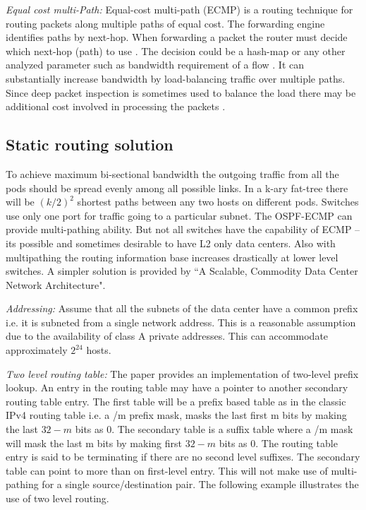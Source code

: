 \documentclass[11pt,letterpaper,onecolumn]{article}
\begin{document}
\par{\textit{Equal cost multi-Path:} Equal-cost multi-path (ECMP) is a routing technique for routing packets along multiple paths of equal cost.  The forwarding engine identifies paths by next-hop.  When forwarding a packet the router must decide which next-hop (path) to use \cite{hopps2000analysis}. The decision could be a hash-map or any other analyzed parameter such as bandwidth requirement of a flow . It can substantially increase bandwidth by load-balancing traffic over multiple paths. Since deep packet inspection is sometimes used to balance the load there may be additional cost involved in processing the packets \cite{wiki:003}.}\\

\subsection{Static routing solution}

\par{\qquad To achieve maximum bi-sectional bandwidth the outgoing traffic from all the pods should be spread evenly among all possible links. In a k-ary fat-tree there will be $(k/2)^2$ shortest paths between any two hosts on different pods. Switches use only one port for traffic going to a particular subnet. The OSPF-ECMP can provide multi-pathing ability. But not all switches have the capability of ECMP  -- its possible and sometimes desirable to have L2 only data centers. Also with multipathing the routing information base increases drastically at lower level switches. A simpler solution is provided by ``A Scalable, Commodity Data Center Network Architecture"\cite{al2008scalable}.}\\

\par{\textit{Addressing:} Assume that all the subnets of the data center have a common prefix i.e. it is subneted from a single network address. This is a reasonable assumption due to the availability of class A private addresses. This can accommodate approximately $2^24$ hosts.}\\

\par{\textit{Two level routing table:} The paper \cite{al2008scalable} provides an implementation of two-level prefix lookup. An entry in the routing table may have a pointer to another secondary routing table entry. The first table will be a prefix based table as in the classic IPv4 routing table i.e. a /m prefix mask, masks the last first m bits by making the last $32-m$ bits as $0$. The secondary table is a suffix table where a /m mask will mask the last m bits by making first $32 - m$ bits as $0$. The routing table entry is said to be terminating if there are no second level suffixes. The secondary table can point to more than on first-level entry. This will not make use of multi-pathing for a single source/destination pair. The following example illustrates the use of two level routing.}\\
\end{document}
